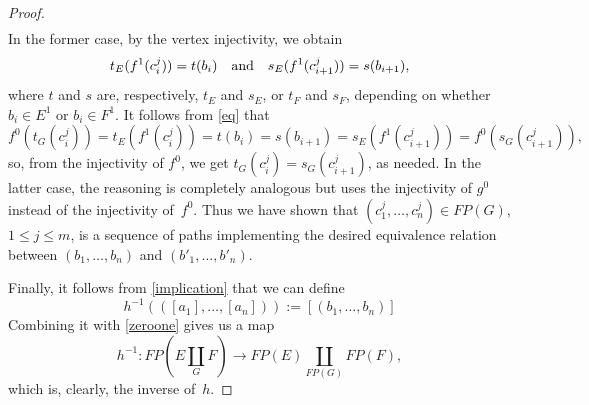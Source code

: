 \documentclass[12pt,times,a4paper]{amsart}
\numberwithin{equation}{section}
\def\text{\hbox}
\numberwithin{equation}{section}
\begin{document}
\begin{proof}
\begin{gather}
\end{gather}
 In the former case, by the vertex injectivity, we obtain
\begin{equation}\label{eq}
t_E(f^1(c^j_i))=t(b_i)\quad\text{and}\quad s_E(f^1(c^j_{i+1}))=s(b_{i+1}),
\end{equation}
where $t$ and $s$ are, respectively, $t_E$ and $s_E$, or $t_F$ and $s_F$, depending on whether
$b_i\in E^1$ or $b_i\in F^1$. It follows from \eqref{eq} that
\begin{equation}
f^0(t_G(c^j_i))=t_E(f^1(c^j_i))=t(b_i)=s(b_{i+1})=s_E(f^1(c^j_{i+1}))=f^0(s_G(c^j_{i+1})),
\end{equation}
so, from the injectivity of $f^0$, we get $t_G(c^j_i)=s_G(c^j_{i+1})$, as needed. In the latter case,
the reasoning is completely analogous but uses the injectivity of $g^0$ instead of the injectivity of~$f^0$.
Thus we have shown that $(c^j_1,\ldots,c^j_n)\in FP(G)$, $1\leq j\leq m$, is a sequence of paths
 implementing the desired equivalence relation between $(b_1,\ldots,b_n)$ and $(b'_1,\ldots,b'_n)$.

Finally, it follows from \eqref{implication} that we can define 
\begin{equation}
h^{-1}(([a_1],\ldots,[a_n])):=[(b_1,\ldots,b_n)]
\end{equation} 
Combining it with \eqref{zeroone} gives us
a map 
\begin{equation}
h^{-1}:FP\left(E\underset{G}{\amalg}F\right)\longrightarrow FP(E)\underset{FP(G)}{\amalg}FP(F),
\end{equation} 
which is, clearly, the inverse of~$h$. 
\end{proof}
\end{document}
